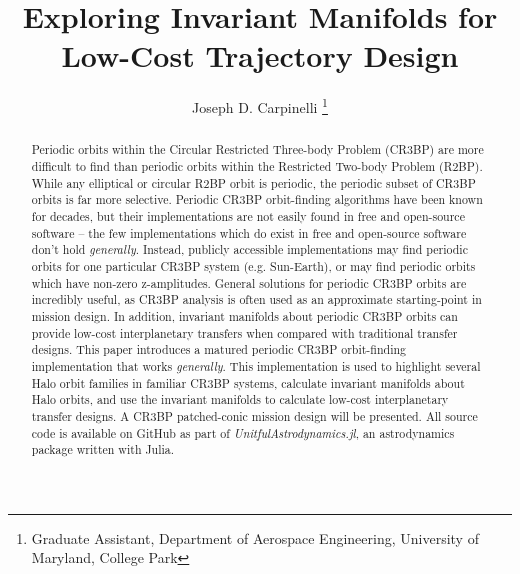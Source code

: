 \documentclass[conf]{new-aiaa}
\title{Exploring Invariant Manifolds for Low-Cost Trajectory Design}
\author{Joseph D. Carpinelli
    \footnote{
        Graduate Assistant, 
        Department of Aerospace Engineering, 
        University of Maryland, College Park}}
\affil{DRAFT -- Extended Abstract \\ \today}
\begin{document}
\maketitle

\begin{abstract}
    Periodic orbits within the Circular Restricted Three-body Problem 
    (CR3BP) are more difficult to find than periodic orbits within the 
    Restricted Two-body Problem (R2BP). While any  elliptical or circular 
    R2BP orbit is periodic, the periodic subset of CR3BP orbits is far 
    more selective. Periodic CR3BP orbit-finding algorithms 
    have been known for decades, but their implementations are not easily
    found in free and open-source software -- the few implementations
    which do exist in free and open-source software don't hold 
    \textit{generally}. Instead, publicly accessible implementations may 
    find periodic orbits for one particular CR3BP system (e.g. Sun-Earth), 
    or  may find periodic orbits which have non-zero z-amplitudes. 
    General solutions for periodic CR3BP orbits are incredibly useful, as 
    CR3BP analysis is often used as an approximate starting-point in 
    mission design. In addition, invariant manifolds about periodic 
    CR3BP orbits can provide low-cost interplanetary transfers when 
    compared with traditional transfer designs. This paper introduces 
    a matured periodic CR3BP orbit-finding implementation that works 
    \textit{generally}. This implementation is used to highlight several
    Halo orbit families in familiar CR3BP systems, calculate invariant 
    manifolds about Halo orbits, and use the invariant manifolds to 
    calculate low-cost interplanetary transfer designs. A CR3BP 
    patched-conic mission design will be presented. All source code 
    is available on GitHub as part of 
    \textit{UnitfulAstrodynamics.jl}, an astrodynamics package written 
    with Julia.

\end{abstract}
\end{document}
